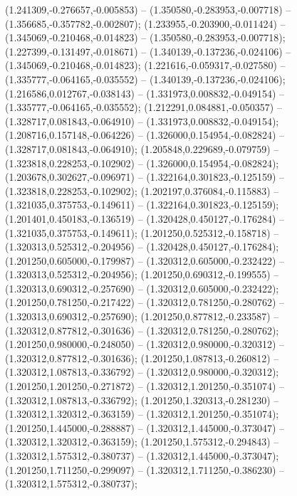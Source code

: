 (1.241309,-0.276657,-0.005853) -- (1.350580,-0.283953,-0.007718) -- (1.356685,-0.357782,-0.002807);
 (1.233955,-0.203900,-0.011424) -- (1.345069,-0.210468,-0.014823) -- (1.350580,-0.283953,-0.007718);
 (1.227399,-0.131497,-0.018671) -- (1.340139,-0.137236,-0.024106) -- (1.345069,-0.210468,-0.014823);
 (1.221616,-0.059317,-0.027580) -- (1.335777,-0.064165,-0.035552) -- (1.340139,-0.137236,-0.024106);
 (1.216586,0.012767,-0.038143) -- (1.331973,0.008832,-0.049154) -- (1.335777,-0.064165,-0.035552);
 (1.212291,0.084881,-0.050357) -- (1.328717,0.081843,-0.064910) -- (1.331973,0.008832,-0.049154);
 (1.208716,0.157148,-0.064226) -- (1.326000,0.154954,-0.082824) -- (1.328717,0.081843,-0.064910);
 (1.205848,0.229689,-0.079759) -- (1.323818,0.228253,-0.102902) -- (1.326000,0.154954,-0.082824);
 (1.203678,0.302627,-0.096971) -- (1.322164,0.301823,-0.125159) -- (1.323818,0.228253,-0.102902);
 (1.202197,0.376084,-0.115883) -- (1.321035,0.375753,-0.149611) -- (1.322164,0.301823,-0.125159);
 (1.201401,0.450183,-0.136519) -- (1.320428,0.450127,-0.176284) -- (1.321035,0.375753,-0.149611);
 (1.201250,0.525312,-0.158718) -- (1.320313,0.525312,-0.204956) -- (1.320428,0.450127,-0.176284);
 (1.201250,0.605000,-0.179987) -- (1.320312,0.605000,-0.232422) -- (1.320313,0.525312,-0.204956);
 (1.201250,0.690312,-0.199555) -- (1.320313,0.690312,-0.257690) -- (1.320312,0.605000,-0.232422);
 (1.201250,0.781250,-0.217422) -- (1.320312,0.781250,-0.280762) -- (1.320313,0.690312,-0.257690);
 (1.201250,0.877812,-0.233587) -- (1.320312,0.877812,-0.301636) -- (1.320312,0.781250,-0.280762);
 (1.201250,0.980000,-0.248050) -- (1.320312,0.980000,-0.320312) -- (1.320312,0.877812,-0.301636);
 (1.201250,1.087813,-0.260812) -- (1.320312,1.087813,-0.336792) -- (1.320312,0.980000,-0.320312);
 (1.201250,1.201250,-0.271872) -- (1.320312,1.201250,-0.351074) -- (1.320312,1.087813,-0.336792);
 (1.201250,1.320313,-0.281230) -- (1.320312,1.320312,-0.363159) -- (1.320312,1.201250,-0.351074);
 (1.201250,1.445000,-0.288887) -- (1.320312,1.445000,-0.373047) -- (1.320312,1.320312,-0.363159);
 (1.201250,1.575312,-0.294843) -- (1.320312,1.575312,-0.380737) -- (1.320312,1.445000,-0.373047);
 (1.201250,1.711250,-0.299097) -- (1.320312,1.711250,-0.386230) -- (1.320312,1.575312,-0.380737);
